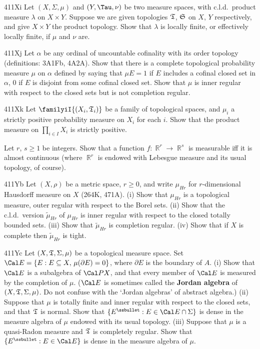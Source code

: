 {\spheader 411Xi Let $(X,\Sigma,\mu)$ and $(Y,\Tau,\nu)$ be two measure
spaces, with c.l.d.\ product measure $\lambda$ on $X\times Y$.   Suppose
we are given topologies $\frak T$, $\frak S$ on $X$, $Y$ respectively,
and give $X\times Y$ the product topology.   Show that $\lambda$ is
locally finite, or effectively locally finite, if $\mu$ and $\nu$ are.

\spheader 411Xj Let $\alpha$ be any ordinal of uncountable cofinality
with its order topology (definitions:  3A1Fb, 4A2A).   Show that there is a complete topological
probability measure $\mu$ on $\alpha$ defined by saying that $\mu E=1$
if $E$ includes a cofinal closed set in $\alpha$, $0$ if $E$ is
disjoint from some
cofinal closed set.   Show that $\mu$ is inner regular with respect to
the closed sets but is not completion regular.

\spheader 411Xk Let $\familyiI{(X_i,\frak T_i)}$ be a family
of topological spaces, and $\mu_i$ a strictly positive probability measure
on $X_i$ for each $i$.   Show that the product measure on 
$\prod_{i\in I}X_i$ is strictly positive.

Let $r$, $s\ge 1$ be integers.
Show that a function $f:\BbbR^r\to\BbbR^s$ is measurable
iff it is almost continuous (where $\BbbR^r$ is endowed with Lebesgue
measure and its usual topology, of course).   

\spheader 411Yb Let $(X,\rho)$ be a metric space, $r\ge 0$, and write
$\mu_{Hr}$ for $r$-dimensional Hausdorff measure on $X$ (264K,
471A).   (i) Show that $\mu_{Hr}$ is a topological measure, outer
regular with respect to the
Borel sets.  (ii) Show that the c.l.d.\ version $\tilde\mu_{Hr}$ of
$\mu_{Hr}$ is inner regular with respect to the closed totally bounded
sets.   (iii) Show that $\tilde\mu_{Hr}$ is completion regular.
(iv) Show that if $X$ is complete then $\tilde\mu_{Hr}$ is tight.

\spheader 411Yc Let $(X,\frak T,\Sigma,\mu)$ be a topological measure
space.   Set $\Cal E=\{E:E\subseteq X,\,\mu(\partial E)=0\}$, where
$\partial E$ is the boundary of $A$.   (i) Show that $\Cal E$ is a
subalgebra of $\Cal PX$, and that every member of $\Cal E$ is measured
by the completion of $\mu$.   ($\Cal E$ is sometimes called the {\bf
Jordan algebra} of $(X,\frak T,\Sigma,\mu)$.   Do not confuse with the
`Jordan algebras' of abstract algebra.)   (ii) Suppose that $\mu$
is totally finite and inner regular with respect to the
closed sets, and that $\frak T$ is normal.   Show that
$\{E^{\ssbullet}:E\in\Cal E\cap\Sigma\}$ is dense in the measure algebra of
$\mu$ endowed with its usual topology.
(iii) Suppose that $\mu$ is a quasi-Radon measure
and $\frak T$ is completely regular.
Show that $\{E^{\ssbullet}:E\in\Cal E\}$ is dense in the measure
algebra of $\mu$.   

}
